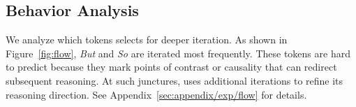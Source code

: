 

    
\subsection{Behavior Analysis}

We analyze which tokens \name selects for deeper iteration.
As shown in Figure~\ref{fig:flow}, \textit{But} and \textit{So} are iterated most frequently.
These tokens are hard to predict because they mark points of contrast or causality that can redirect subsequent reasoning.
At such junctures, \name uses additional iterations to refine its reasoning direction.
See Appendix~\ref{sec:appendix/exp/flow} for details.

